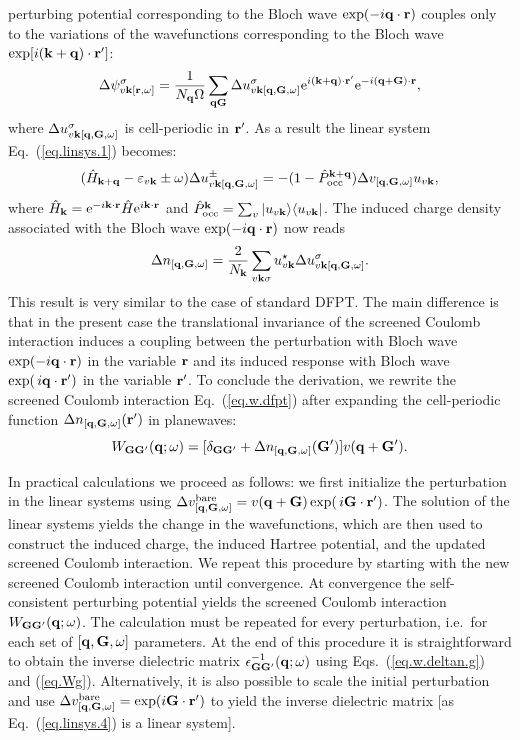 \documentclass[twocolumn,prb,showpacs,superscriptaddress]{revtex4}
\def\w{\omega}
\def\H{\hat{H}}
\def\P{\hat{P}_{\rm occ}}
\def\E{\varepsilon}
\def\q{{\bf q}}
\def\s{\sigma}
\def\k{{\bf k}}
\def\G{{\bf G}}
\def\Gp{{\bf G^\prime}}
\def\r{{\bf r}}
\def\rp{{\bf r^\prime}}
\begin{document}
perturbing potential corresponding to the Bloch wave ${\rm exp}(-i\q\cdot\r)$
couples only to the variations of the wavefunctions corresponding to
the Bloch wave ${\rm exp}[i(\k+\q)\cdot\rp]$:
  \begin{equation}
  \Delta \psi^\sigma_{v\k[\r,\w]} = \frac{1}{N_\q\Omega} \sum_{\q\G} \Delta u^\sigma_{v\k[\q,\G,\w]} 
  {\rm e}^{i(\k+\q)\cdot\rp} {\rm e}^{-i(\q+\G)\cdot\r},
  \end{equation}
where $\Delta u^\sigma_{v\k[\q,\G,\w]}$ is cell-periodic in $\rp$.
As a result the linear system Eq.\ (\ref{eq.linsys.1}) becomes:
  \begin{equation}\label{eq.linsys.4}
  (\H_{\k+\q}-\E_{v\k}\pm\w) \Delta u^\pm_{v\k[\q,\G,\w]}  = -(1-\P^{\k+\q}) \Delta v_{[\q,\G,\w]} u_{v\k},
  \end{equation}
where $\H_\k= {\rm e}^{-i\k\cdot\r} \H {\rm e}^{i\k\cdot\r}$ and
$\P^\k=\sum_v | u_{v\k} \rangle \langle u_{v\k}|$.
The induced charge density associated with the Bloch wave ${\rm exp}(-i\q\cdot\r)$ 
now reads 
  \begin{equation} \label{eq.deltan.bloch}
  \Delta n_{[\q,\G,\w]} = \frac{2}{N_\k}\sum_{v\k\s} u_{v\k}^\star  \Delta u^\s_{v\k[\q,\G,\w]}.
  \end{equation}
This result is very similar to the case of standard DFPT.\cite{baroni.rmp} 
The main difference is that in the present case the translational invariance 
of the screened Coulomb interaction induces a coupling between the perturbation 
with Bloch wave ${\rm exp}(-i\q\cdot\r)$ in the variable $\r$ and its induced
response with Bloch wave ${\rm exp}(\,i\q\cdot\rp)$ in the variable $\rp$.
%
To conclude the derivation, we rewrite the screened Coulomb interaction 
Eq.\ (\ref{eq.w.dfpt}) after expanding the cell-periodic function 
$\Delta n_{[\q,\G,\w]}(\rp)$ in planewaves:
  \begin{equation}\label{eq.w.deltan.g}
  W_{\G\Gp}(\q;\w) = [\delta_{\G\Gp} + \Delta n_{[\q,\G,\w]}(\Gp) ]v(\q+\Gp).
  \end{equation}

In practical calculations we proceed as follows: we first initialize the perturbation
in the linear systems using 
$\Delta v^{\rm bare}_{[\q,\G,\w]} = v(\q+\G) \, {\rm exp}(\,i\G\cdot\rp)$.
The solution of the linear systems yields the change in the wavefunctions,
which are then used to construct the induced charge, the induced Hartree potential,
and the updated screened Coulomb interaction. We repeat this procedure by starting with
the new screened Coulomb interaction until convergence.
At convergence the self-consistent perturbing potential yields
the screened Coulomb interaction $W_{\G\Gp}(\q;\w)$.
The calculation must be repeated for every perturbation, i.e.\ for
each set of $[\q,\G,\w]$ parameters.
%
At the end of this procedure it is straightforward to obtain the inverse dielectric matrix 
$\epsilon^{-1}_{\G\Gp}(\q;\w)$ using Eqs.~(\ref{eq.w.deltan.g}) and 
(\ref{eq.Wg}). Alternatively, it is also possible to scale the initial
perturbation and use $\Delta v^{\rm bare}_{[\q,\G,\w]} = {\rm exp}(i\G\cdot\rp)$
to yield the inverse dielectric matrix [as Eq.~(\ref{eq.linsys.4}) is a linear system].
\end{document}
